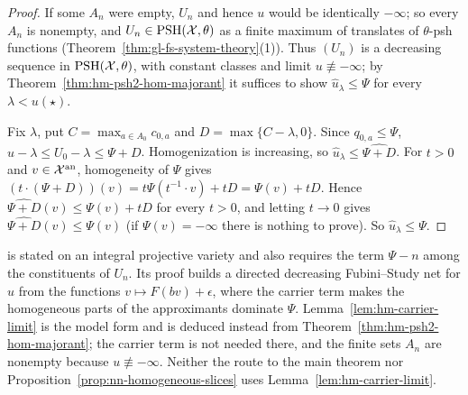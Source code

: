\begin{proof}
If some $A_n$ were empty, $U_n$ and hence $u$ would be identically $-\infty$; so every $A_n$ is nonempty, and $U_n\in\operatorname{PSH}(\mathcal X,\theta)$ as a finite
maximum of translates of $\theta$-psh functions (Theorem~\ref{thm:gl-fs-system-theory}(1)). Thus $(U_n)$ is a decreasing sequence in $\operatorname{PSH}(\mathcal X,\theta)$,
with constant classes and limit $u\not\equiv-\infty$; by Theorem~\ref{thm:hm-psh2-hom-majorant} it suffices to show $\hat u_\lambda\le\Psi$ for every
$\lambda<u(\star)$.

Fix $\lambda$, put $C=\max_{a\in A_0}c_{0,a}$ and $D=\max\{C-\lambda,0\}$. Since $q_{0,a}\le\Psi$, $u-\lambda\le U_0-\lambda\le\Psi+D$. Homogenization
is increasing, so $\hat u_\lambda\le\widehat{\Psi+D}$. For $t>0$ and $v\in\mathcal X^{\mathrm{an}}$, homogeneity of $\Psi$ gives
$(t\cdot(\Psi+D))(v)=t\Psi(t^{-1}\cdot v)+tD=\Psi(v)+tD$. Hence $\widehat{\Psi+D}(v)\le\Psi(v)+tD$ for every $t>0$, and letting $t\to0$ gives
$\widehat{\Psi+D}(v)\le\Psi(v)$ (if $\Psi(v)=-\infty$ there is nothing to prove). So $\hat u_\lambda\le\Psi$.
\end{proof}

\begin{remark}\label{rmk:hm-carrier-limit-source}
\cite[Lemma~7.4]{FHX} is stated on an integral projective variety and also requires the term $\Psi-n$ among the constituents of $U_n$. Its proof builds a
directed decreasing Fubini--Study net for $u$ from the functions $v\mapsto F(bv)+\epsilon$, where the carrier term makes the homogeneous parts of the
approximants dominate $\Psi$. Lemma~\ref{lem:hm-carrier-limit} is the model form and is deduced instead from Theorem~\ref{thm:hm-psh2-hom-majorant}; the
carrier term is not needed there, and the finite sets $A_n$ are nonempty because $u\not\equiv-\infty$. Neither the route to the main theorem nor
Proposition~\ref{prop:nn-homogeneous-slices} uses Lemma~\ref{lem:hm-carrier-limit}.
\end{remark}

